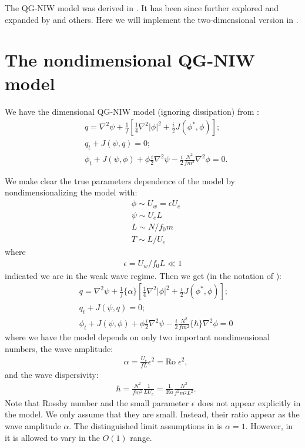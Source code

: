 \graphicspath{{2D_QGNIW/figs/}}

The QG-NIW model was derived in \cite{XieVanneste_15}. It has been since further explored and expanded by \cite{WagnerYoung_15, WagnerYoung_16, AsselinYoung_19} and others. Here we will implement the two-dimensional version in \cite{RochaEtAl_18}. 

\section{The nondimensional QG-NIW model}
We have the dimensional QG-NIW model (ignoring dissipation) from \cite[(2.6--8)]{RochaEtAl_18}:
\begin{align}
    &q = \nabla^2\psi + \frac{1}{f}\left[\frac{1}{4}\nabla^2|\phi|^2+\frac{i}{2}J(\phi^*,\phi)\right];\\
    &q_t + J(\psi,q) = 0;\\
    &\phi_t+J(\psi,\phi)+\phi\frac{i}{2}\nabla^2\psi-\frac{i}{2} \frac{N^2}{f m^2} \nabla^2\phi = 0.
\end{align}

We make clear the true parameters dependence of the model by nondimensionalizing the model with:
\begin{align}
    &\phi \sim U_w = \epsilon U_e\\
    &\psi \sim U_e L\\
    &L \sim N/f_0m\\
    &T \sim L/U_e
\end{align}
where
\begin{align}
    \epsilon = {U_w}/{f_0L}\ll 1
\end{align}
indicated we are in the weak wave regime. Then we get (in the notation of \cite{Vallis_96a}):
\begin{align}
    &q = \nabla^2\psi + \frac{1}{f}\{\alpha\}\left[\frac{1}{4}\nabla^2|\phi|^2+\frac{i}{2}J(\phi^*,\phi)\right];\\
    &q_t + J(\psi,q) = 0;\\
    &\phi_t+J(\psi,\phi)+\phi\frac{i}{2}\nabla^2\psi-\frac{i}{2} \frac{N^2}{f m^2} \{\hbar\}\nabla^2\phi = 0
\end{align}
where we have the model depends on only two important nondimensional numbers, the wave amplitude:
\begin{align}
    &\alpha = \frac{U_e}{fL}\epsilon^2 = \text{Ro}\;\epsilon^2,
\end{align}
and the wave dispersivity:
\begin{align}
    &\hbar = \frac{N^2}{fm^2}\frac{1}{LU_e} = \frac{1}{\text{Ro}}\frac{N^2}{f^2 m^2 L^2}.
\end{align}
Note that Rossby number and the small parameter $\epsilon$ does not appear explicitly in the model. We only assume that they are small. Instead, their ratio appear as the wave amplitude $\alpha$. The distinguished limit assumptions in \cite{XieVanneste_15, WagnerYoung_15, WagnerYoung_16} is $\alpha = 1$. However, in \cite{RochaEtAl_18} it is allowed to vary in the $O(1)$ range.


